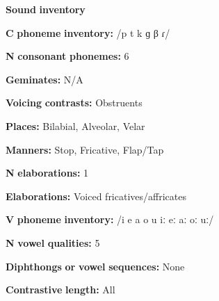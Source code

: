 \documentclass[output=paper]{langsci/langscibook}
\begin{document}
\begin{styleBody}
\textbf{Sound} \textbf{inventory}
\end{styleBody}

\begin{styleBody}
\textbf{C} \textbf{phoneme} \textbf{inventory:} /p t k ɡ β ɾ/
\end{styleBody}

\begin{styleBody}
\textbf{N} \textbf{consonant} \textbf{phonemes:} 6
\end{styleBody}

\begin{styleBody}
\textbf{Geminates:} N/A
\end{styleBody}

\begin{styleBody}
\textbf{Voicing} \textbf{contrasts:} Obstruents
\end{styleBody}

\begin{styleBody}
\textbf{Places:} Bilabial, Alveolar, Velar
\end{styleBody}

\begin{styleBody}
\textbf{Manners:} Stop, Fricative, Flap/Tap
\end{styleBody}

\begin{styleBody}
\textbf{N} \textbf{elaborations:} 1
\end{styleBody}

\begin{styleBody}
\textbf{Elaborations:} Voiced fricatives/affricates
\end{styleBody}

\begin{styleBody}
\textbf{V} \textbf{phoneme} \textbf{inventory:} /i e a o u iː eː aː oː uː/
\end{styleBody}

\begin{styleBody}
\textbf{N} \textbf{vowel} \textbf{qualities:} 5
\end{styleBody}

\begin{styleBody}
\textbf{Diphthongs} \textbf{or} \textbf{vowel} \textbf{sequences:} None
\end{styleBody}

\begin{styleBody}
\textbf{Contrastive} \textbf{length:} All
\end{styleBody}
\end{document}
